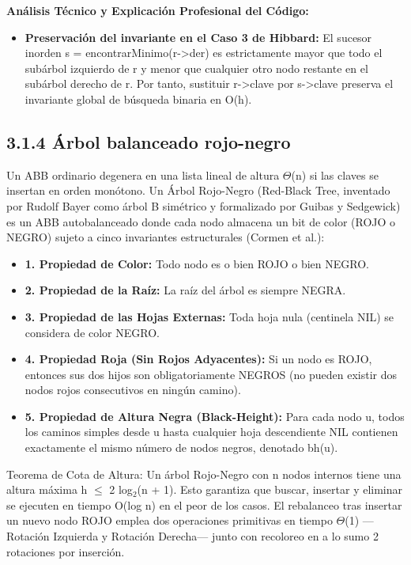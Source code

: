 \documentclass[11pt,letterpaper]{article}
\begin{document}
\noindent\textbf{\color{ipnguinda}Análisis Técnico y Explicación Profesional del Código:}\par\vspace{-2pt}
\begin{itemize}
\setlength{\itemsep}{2pt}\setlength{\parskip}{0pt}
  \item \textbf{Preservación del invariante en el Caso 3 de Hibbard: }El sucesor inorden s = encontrarMinimo(r->der) es estrictamente mayor que todo el subárbol izquierdo de r y menor que cualquier otro nodo restante en el subárbol derecho de r. Por tanto, sustituir r->clave por s->clave preserva el invariante global de búsqueda binaria en O(h).
\end{itemize}
\subsection*{3.1.4 Árbol balanceado rojo-negro}
Un ABB ordinario degenera en una lista lineal de altura $\Theta$(n) si las claves se insertan en orden monótono. Un Árbol Rojo-Negro (Red-Black Tree, inventado por Rudolf Bayer como árbol B simétrico y formalizado por Guibas y Sedgewick) es un ABB autobalanceado donde cada nodo almacena un bit de color (ROJO o NEGRO) sujeto a cinco invariantes estructurales (Cormen et al.):\par
\begin{itemize}
\setlength{\itemsep}{2pt}\setlength{\parskip}{0pt}
  \item \textbf{1. Propiedad de Color: }Todo nodo es o bien ROJO o bien NEGRO.
  \item \textbf{2. Propiedad de la Raíz: }La raíz del árbol es siempre NEGRA.
  \item \textbf{3. Propiedad de las Hojas Externas: }Toda hoja nula (centinela NIL) se considera de color NEGRO.
  \item \textbf{4. Propiedad Roja (Sin Rojos Adyacentes): }Si un nodo es ROJO, entonces sus dos hijos son obligatoriamente NEGROS (no pueden existir dos nodos rojos consecutivos en ningún camino).
  \item \textbf{5. Propiedad de Altura Negra (Black-Height): }Para cada nodo u, todos los caminos simples desde u hasta cualquier hoja descendiente NIL contienen exactamente el mismo número de nodos negros, denotado bh(u).
\end{itemize}
Teorema de Cota de Altura: Un árbol Rojo-Negro con n nodos internos tiene una altura máxima h $\le$ 2 log$_2$(n + 1). Esto garantiza que buscar, insertar y eliminar se ejecuten en tiempo O(log n) en el peor de los casos. El rebalanceo tras insertar un nuevo nodo ROJO emplea dos operaciones primitivas en tiempo $\Theta$(1) —Rotación Izquierda y Rotación Derecha— junto con recoloreo en a lo sumo 2 rotaciones por inserción.\par
\end{document}
